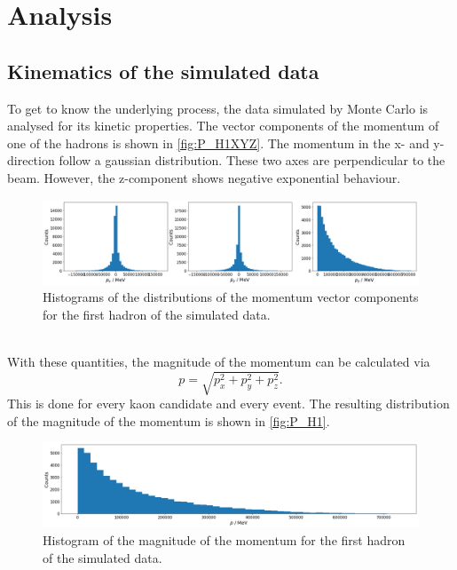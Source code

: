 \section{Analysis}
\label{sec:Analysis}

\subsection{Kinematics of the simulated data}
\label{sec:simdata}
To get to know the underlying process, the data simulated by Monte Carlo is analysed for its kinetic properties. The vector components of the momentum
of one of the hadrons is shown in \autoref{fig:P_H1XYZ}. The momentum in the x- and y- direction follow a gaussian distribution. These two axes are perpendicular
to the beam. However, the z-component shows negative exponential behaviour.
\begin{figure}
  \centering
  \includegraphics[width = .95\textwidth]{"content/pics/P_H1XYZ.png"}

  \caption{Histograms of the distributions of the momentum vector components for the first hadron of the simulated data.}
  \label{fig:P_H1XYZ}
\end{figure}
\\ With these quantities, the magnitude of the momentum can be calculated via 
\begin{equation}
  \label{eq:magn_p}
    p = \sqrt{p_x^2 + p_y^2 + p_z^2}.
\end{equation}
This is done for every kaon candidate and every event.
The resulting distribution of the magnitude of the momentum is shown in \autoref{fig:P_H1}.
\begin{figure}
  \centering
  \includegraphics[width = .95\textwidth]{"content/pics/P_H1.png"}
  \caption{Histogram of the magnitude of the momentum for the first hadron of the simulated data.}
  \label{fig:P_H1}
\end{figure}

